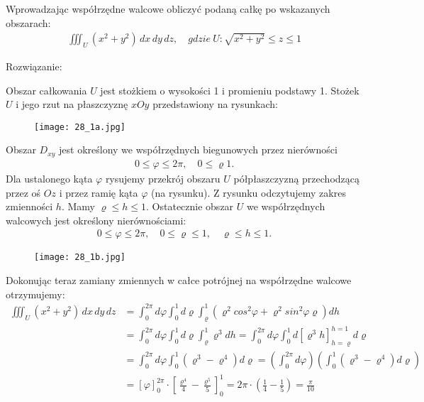 \documentclass[main.tex]{subfiles}
\begin{document}
    \begin{exercise}
        Wprowadzając współrzędne walcowe obliczyć podaną całkę po wskazanych obszarach:
        \begin{align*}
            \iiint_U (x^2+y^2) \,dx\,dy\,dz, \quad gdzie \ U: \sqrt{x^2+y^2} \leq z \leq 1
        \end{align*}
    \end{exercise}

    Rozwiązanie:

    Obszar całkowania $U$ jest stożkiem o wysokości 1 i promieniu podstawy 1. Stożek $U$ i jego rzut na płaszczyznę $xOy$ przedstawiony na rysunkach:
    \begin{figure}[H]
        \texttt{[image: 28\_1a.jpg]}
    \end{figure}

    Obszar $D_{xy}$ jest określony we współrzędnych biegunowych przez nierówności
    \begin{align*}
        0 \leq \varphi \leq 2\pi, \quad 0 \leq \varrho 1 .
    \end{align*}
    Dla ustalonego kąta $\varphi$ rysujemy przekrój obszaru $U$ półpłaszczyzną przechodzącą przez oś $Oz$ i przez ramię kąta $\varphi$ (na rysunku). Z rysunku odczytujemy zakres zmienności $h$. Mamy $\varrho \leq h \leq 1$. Ostatecznie obszar $U$ we współrzędnych walcowych jest określony nierównościami:
    \begin{align*}
        0 \leq \varphi \leq 2\pi, \quad 0 \leq \varrho \leq 1, \quad \varrho \leq h \leq 1.
    \end{align*}

    \begin{figure}[H]
        \texttt{[image: 28\_1b.jpg]}
    \end{figure}

    Dokonując teraz zamiany zmiennych w całce potrójnej na współrzędne walcowe otrzymujemy:
    \begin{align*}
        \iiint_U (x^2+y^2) \,dx\,dy\,dz &= \int_{0}^{2\pi} d\varphi \int_{0}^{1} d\varrho \int_{\varrho}^{1} (\varrho^2 cos^2\varphi+\varrho^2sin^2\varphi \varrho) dh
        \\ &= \int_{0}^{2\pi} d\varphi \int_{0}^{1} d\varrho \int_{\varrho}^{1} \varrho^3 dh = \int_{0}^{2\pi} d\varphi \int_{0}^{1} d \left[ \varrho^3 h \right]_{h=\varrho}^{h=1} d\varrho
        \\ &= \int_{0}^{2\pi} d\varphi \int_{0}^{1} (\varrho^3 - \varrho^4) d\varrho  = \left(\int_{0}^{2\pi}d\varphi\right) \left( \int_{0}^{1} (\varrho^3 - \varrho^4) d\varrho\right)
        \\ &= \left[\varphi\right]_0^{2\pi} \cdot \left[\frac{\varrho^4}{4} - \frac{\varrho^5}{5}\right]_0^1 = 2\pi \cdot \left(\frac{1}{4}-\frac{1}{5}\right) = \frac{\pi}{10}
    \end{align*}
\end{document}

